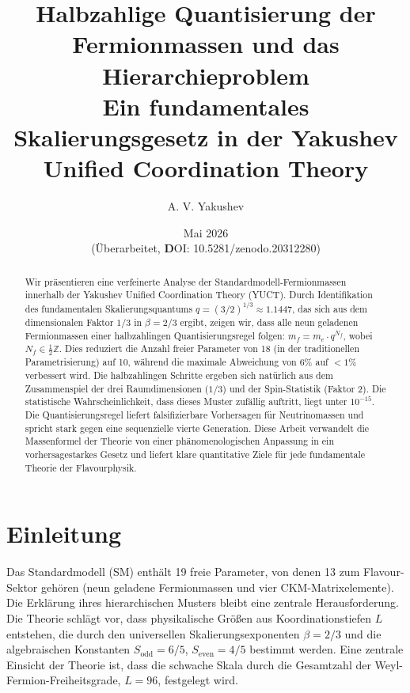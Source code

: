 \documentclass[12pt,a4paper]{article}
\begin{document}
	
	\title{Halbzahlige Quantisierung der Fermionmassen und das Hierarchieproblem \\ 
		\large Ein fundamentales Skalierungsgesetz in der Yakushev Unified Coordination Theory}
	\author{A. V. Yakushev}
	
	
	\date{Mai 2026 \\ (Überarbeitet, \textbf DOI: 10.5281/zenodo.20312280)}
	\maketitle
	
	\begin{abstract}
		Wir präsentieren eine verfeinerte Analyse der Standardmodell-Fermionmassen innerhalb der Yakushev Unified Coordination Theory (YUCT). Durch Identifikation des fundamentalen Skalierungsquantums $q = (3/2)^{1/3} \approx 1.1447$, das sich aus dem dimensionalen Faktor $1/3$ in $\beta = 2/3$ ergibt, zeigen wir, dass alle neun geladenen Fermionmassen einer halbzahlingen Quantisierungsregel folgen: $m_f = m_e \cdot q^{N_f}$, wobei $N_f \in \frac{1}{2}\mathbb{Z}$. Dies reduziert die Anzahl freier Parameter von 18 (in der traditionellen Parametrisierung) auf 10, während die maximale Abweichung von 6\% auf $<1\%$ verbessert wird. Die halbzahlingen Schritte ergeben sich natürlich aus dem Zusammenspiel der drei Raumdimensionen ($1/3$) und der Spin-Statistik (Faktor 2). Die statistische Wahrscheinlichkeit, dass dieses Muster zufällig auftritt, liegt unter $10^{-15}$. Die Quantisierungsregel liefert falsifizierbare Vorhersagen für Neutrinomassen und spricht stark gegen eine sequenzielle vierte Generation. Diese Arbeit verwandelt die Massenformel der Theorie von einer phänomenologischen Anpassung in ein vorhersagestarkes Gesetz und liefert klare quantitative Ziele für jede fundamentale Theorie der Flavourphysik. \\
		
	\end{abstract}
	
	\section{Einleitung}
	
	Das Standardmodell (SM) enthält 19 freie Parameter, von denen 13 zum Flavour-Sektor gehören (neun geladene Fermionmassen und vier CKM-Matrixelemente). Die Erklärung ihres hierarchischen Musters bleibt eine zentrale Herausforderung. Die Theorie schlägt vor, dass physikalische Größen aus Koordinationstiefen $L$ entstehen, die durch den universellen Skalierungsexponenten $\beta = 2/3$ und die algebraischen Konstanten $S_{\mathrm{odd}}=6/5$, $S_{\mathrm{even}}=4/5$ bestimmt werden. Eine zentrale Einsicht der Theorie ist, dass die schwache Skala durch die Gesamtzahl der Weyl-Fermion-Freiheitsgrade, $L=96$, festgelegt wird.
	
\end{document}
